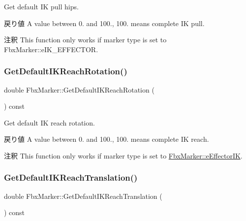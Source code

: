 Get default IK pull hips. \begin{DoxyReturn}{戻り値}
A value between 0. and 100., 100. means complete IK pull. 
\end{DoxyReturn}
\begin{DoxyRemark}{注釈}
This function only works if marker type is set to Fbx\+Marker\+::e\+I\+K\+\_\+\+E\+F\+F\+E\+C\+T\+OR. 
\end{DoxyRemark}
\mbox{\label{class_fbx_marker_a3ac25e2d78c4ed0951259ca9bbbc2ec3}} 
\subsubsection{\texorpdfstring{Get\+Default\+I\+K\+Reach\+Rotation()}{GetDefaultIKReachRotation()}}
{\footnotesize\ttfamily double Fbx\+Marker\+::\+Get\+Default\+I\+K\+Reach\+Rotation (\begin{DoxyParamCaption}{ }\end{DoxyParamCaption}) const}

Get default IK reach rotation. \begin{DoxyReturn}{戻り値}
A value between 0. and 100., 100. means complete IK reach. 
\end{DoxyReturn}
\begin{DoxyRemark}{注釈}
This function only works if marker type is set to \hyperlink{class_fbx_marker_ad1e38753dce9a2212df0364466d9f617a6eb5815d51c3fd66217211a2a4e70538}{Fbx\+Marker\+::e\+Effector\+IK}. 
\end{DoxyRemark}
\mbox{\label{class_fbx_marker_a215e206d448ad64aaa4d2ada99077a58}} 
\subsubsection{\texorpdfstring{Get\+Default\+I\+K\+Reach\+Translation()}{GetDefaultIKReachTranslation()}}
{\footnotesize\ttfamily double Fbx\+Marker\+::\+Get\+Default\+I\+K\+Reach\+Translation (\begin{DoxyParamCaption}{ }\end{DoxyParamCaption}) const}

